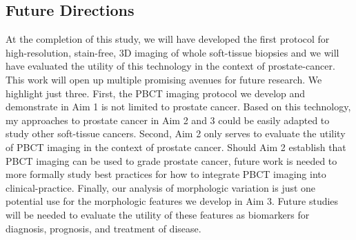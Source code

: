 \documentclass{NIHGrant}
\theoremstyle{theorem}
\begin{document}
\subsection*{Future Directions}
At the completion of this study, we will have developed the first protocol for high-resolution, stain-free, 3D imaging of whole soft-tissue biopsies and we will have evaluated the utility of this technology in the context of prostate-cancer. This work will open up multiple promising avenues for future research. We highlight just three. First, the PBCT imaging protocol we develop and demonstrate in Aim 1 is not limited to prostate cancer. Based on this technology, my approaches to prostate cancer in Aim 2 and 3 could be easily adapted to study other soft-tissue cancers. Second, Aim 2 only serves to evaluate the utility of PBCT imaging in the context of prostate cancer. Should Aim 2 establish that PBCT imaging can be used to grade prostate cancer, future work is needed to more formally study best practices for how to integrate PBCT imaging into clinical-practice. Finally, our analysis of morphologic variation is just one potential use for the morphologic features we develop in Aim 3.  Future studies will be needed to evaluate the utility of these features as biomarkers for diagnosis, prognosis, and treatment of disease.

\newpage


\end{document}

